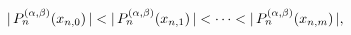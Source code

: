 $|\mathop{P^{(\alpha,\beta)}_{n}\/}\nolimits\!\left(x_{n,0}\right)|<|\mathop{P^%
{(\alpha,\beta)}_{n}\/}\nolimits\!\left(x_{n,1}\right)|<\cdots<|\mathop{P^{(%
\alpha,\beta)}_{n}\/}\nolimits\!\left(x_{n,m}\right)|,$